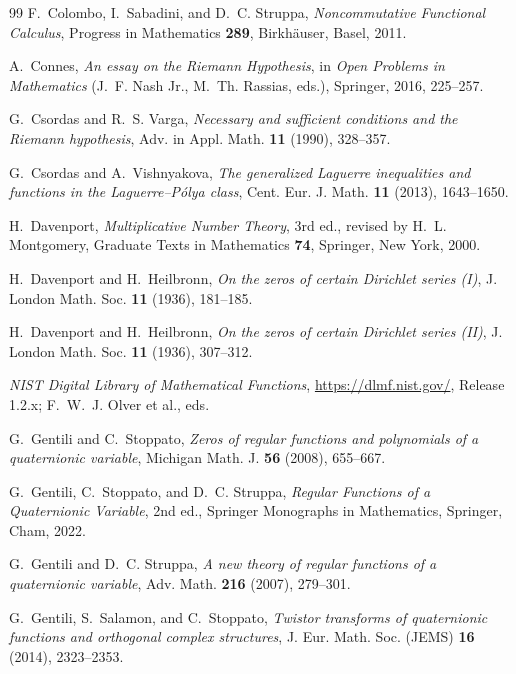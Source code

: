 \documentclass[11pt]{amsart}
\theoremstyle{plain}
\theoremstyle{definition}
\theoremstyle{remark}
\begin{document}
\begin{thebibliography}{99}
F.~Colombo, I.~Sabadini, and D.~C. Struppa,
\emph{Noncommutative Functional Calculus},
Progress in Mathematics \textbf{289}, Birkh\"auser, Basel, 2011.

A.~Connes,
\emph{An essay on the Riemann Hypothesis},
in \emph{Open Problems in Mathematics} (J.~F. Nash Jr., M.~Th. Rassias, eds.), Springer, 2016,
225--257.

G.~Csordas and R.~S. Varga,
\emph{Necessary and sufficient conditions and the Riemann hypothesis},
Adv. in Appl. Math. \textbf{11} (1990), 328--357.

G.~Csordas and A.~Vishnyakova,
\emph{The generalized Laguerre inequalities and functions in the Laguerre--P\'olya class},
Cent. Eur. J. Math. \textbf{11} (2013), 1643--1650.

H.~Davenport,
\emph{Multiplicative Number Theory}, 3rd ed., revised by H.~L. Montgomery,
Graduate Texts in Mathematics \textbf{74}, Springer, New York, 2000.

H.~Davenport and H.~Heilbronn,
\emph{On the zeros of certain Dirichlet series (I)},
J. London Math. Soc. \textbf{11} (1936), 181--185.

H.~Davenport and H.~Heilbronn,
\emph{On the zeros of certain Dirichlet series (II)},
J. London Math. Soc. \textbf{11} (1936), 307--312.

\emph{NIST Digital Library of Mathematical Functions}, \url{https://dlmf.nist.gov/},
Release 1.2.x; F.~W.~J. Olver et al., eds.

G.~Gentili and C.~Stoppato,
\emph{Zeros of regular functions and polynomials of a quaternionic variable},
Michigan Math. J. \textbf{56} (2008), 655--667.

G.~Gentili, C.~Stoppato, and D.~C. Struppa,
\emph{Regular Functions of a Quaternionic Variable}, 2nd ed.,
Springer Monographs in Mathematics, Springer, Cham, 2022.

G.~Gentili and D.~C. Struppa,
\emph{A new theory of regular functions of a quaternionic variable},
Adv. Math. \textbf{216} (2007), 279--301.

G.~Gentili, S.~Salamon, and C.~Stoppato,
\emph{Twistor transforms of quaternionic functions and orthogonal complex structures},
J. Eur. Math. Soc. (JEMS) \textbf{16} (2014), 2323--2353.


\end{thebibliography}
\end{document}
